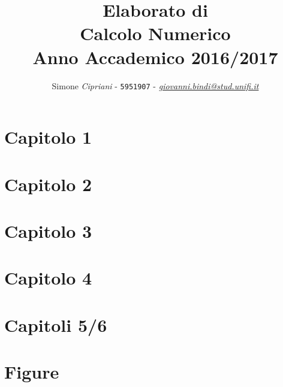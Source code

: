 \documentclass[a4paper]{article}
\date{}
\begin{document}
\title{\vspace{2cm}Elaborato di\\ \textbf{Calcolo Numerico}\\ Anno Accademico 2016/2017\vspace{3cm}}

\author{Simone \emph{Cipriani} - \texttt{5951907} - \href{mailto:sim.cipr@gmail.com}{\textit{giovanni.bindi@stud.unifi.it}}
}

\maketitle
\newpage
\tableofcontents


\newpage
\section{\textbf{Capitolo 1}}
%

\newpage
\section{\textbf{Capitolo 2}}
%

\newpage
\section{\textbf{Capitolo 3}}
%

\newpage
\section{\textbf{Capitolo 4}}
%

\newpage
\section{\textbf{Capitoli 5/6}}
%
\newpage
{}
\section{\textbf{Figure}}
%
\end{document}
